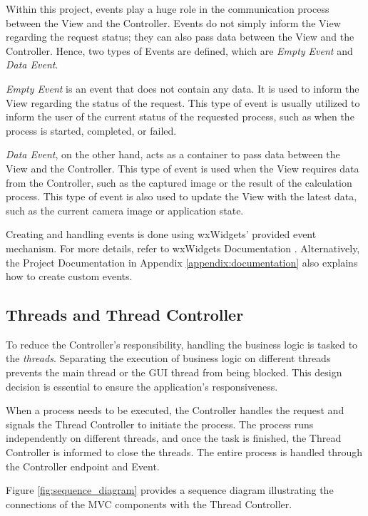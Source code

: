 Within this project, events play a huge role in the communication process between the View and the Controller. Events do not simply inform the View regarding the request status; they can also pass data between the View and the Controller. Hence, two types of Events are defined, which are \textit{Empty Event} and \textit{Data Event}.

\textit{Empty Event} is an event that does not contain any data. It is used to inform the View regarding the status of the request. This type of event is usually utilized to inform the user of the current status of the requested process, such as when the process is started, completed, or failed.

\textit{Data Event}, on the other hand, acts as a container to pass data between the View and the Controller. This type of event is used when the View requires data from the Controller, such as the captured image or the result of the calculation process. This type of event is also used to update the View with the latest data, such as the current camera image or application state.

Creating and handling events is done using wxWidgets' provided event mechanism. For more details, refer to wxWidgets Documentation \cite{wxWidgetsEvent}. Alternatively, the Project Documentation in Appendix \ref{appendix:documentation} also explains how to create custom events.

\subsection{Threads and Thread Controller}
\label{subsec:thread_and_thread_controller}
To reduce the Controller's responsibility, handling the business logic is tasked to the \textit{threads}. Separating the execution of business logic on different threads prevents the main thread or the GUI thread from being blocked. This design decision is essential to ensure the application's responsiveness.

When a process needs to be executed, the Controller handles the request and signals the Thread Controller to initiate the process. The process runs independently on different threads, and once the task is finished, the Thread Controller is informed to close the threads. The entire process is handled through the Controller endpoint and Event.

Figure \ref{fig:sequence_diagram} provides a sequence diagram illustrating the connections of the MVC components with the Thread Controller.

